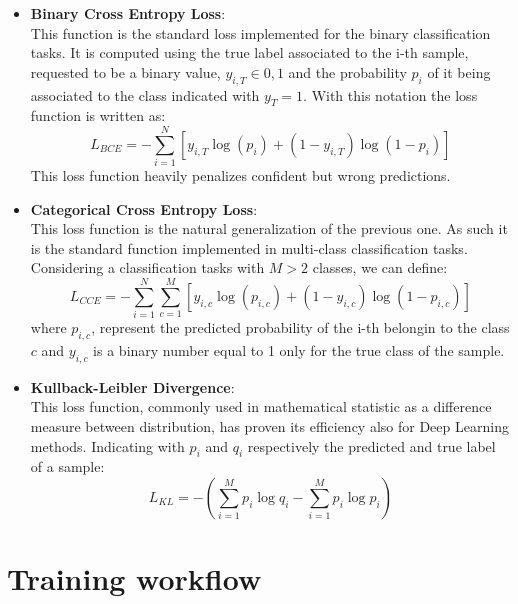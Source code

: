 \documentclass[../../main.tex]{subfiles}
\begin{document}
\begin{itemize}
\begin{equation}
    \end{equation}
\item \textbf{Binary Cross Entropy Loss}:\\
    This function is the standard loss implemented for the binary classification tasks. It is computed using the true label associated to the i-th sample, requested to be a binary value, $y_{i,T}\in{0,1}$ and the probability $p_{i}$ of it being associated to the class indicated with $y_{T}=1$. With this notation the loss function is written as:
    \begin{equation}
        L_{BCE}= -\sum_{i=1}^N\left[ y_{i,T}\log(p_i)+
        \left(1- y_{i,T}\right)\log(1-p_i)\right]
    \end{equation}
    This loss function heavily penalizes confident but wrong predictions. 
\item \textbf{Categorical Cross Entropy Loss}:\\
    This loss function is the natural generalization of the previous one. As such it is the standard function implemented in multi-class classification tasks. Considering a classification tasks with $M>2$ classes, we can define: 
    \begin{equation}
        L_{CCE} = -\sum_{i=1}^N \sum_{c=1}^M  \left[
        y_{i,c}\log(p_{i,c}) + (1-y_{i,c})\log(1-p_{i,c})
        \right]
    \end{equation}
    where $p_{i,c}$, represent the predicted probability of the i-th belongin to the class $c$ and $y_{i,c}$ is a binary number equal to 1 only for the true class of the sample.
\item \textbf{Kullback-Leibler Divergence}:\\
   This loss function, commonly used in mathematical statistic as a difference measure between distribution, has proven its efficiency also for Deep Learning methods\cite{kullbackeff, kullbackeff2}. Indicating with $p_i$ and $q_i$ respectively the predicted and true label of a sample:
    \begin{equation}
        L_{KL} = - \left( \sum_{i=1}^{M} p_{i} \log{q_{i}} - \sum_{i=1}^{M} p_{i} \log{p_{i}} \right)
    \end{equation}
    
\end{itemize}
    
\section{Training workflow}
\label{sec:NN_training}
\end{document}
